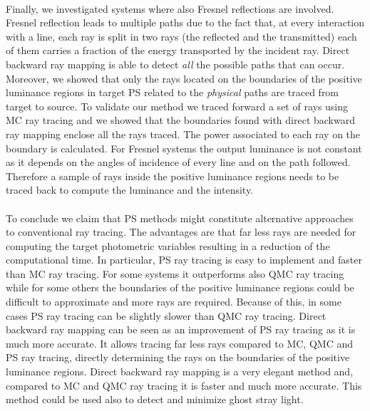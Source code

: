 \\ \indent
Finally, we investigated systems where also Fresnel reflections are involved. Fresnel reflection leads to multiple paths due to the fact that, at every interaction with a line, each ray is split in two rays (the reflected and the transmitted) each of them carries a fraction of the energy transported by the incident ray. Direct backward ray mapping is able to detect \textit{all} the possible paths that can occur. Moreover, we showed that only the rays located on the boundaries of the positive luminance regions in target PS related to the \textit{physical} paths are traced from target to source. To validate our method we traced forward a set of rays using MC ray tracing and we showed that the boundaries found with direct backward ray mapping enclose all the rays traced. The power associated to each ray on the boundary is calculated. For Fresnel systems the output luminance is not constant as it depends on the angles of incidence of every line and on the path followed. Therefore a sample of rays inside the positive luminance regions needs to be traced back to compute the luminance and the intensity.
\\ \\ \indent To conclude we claim that PS methods might constitute alternative approaches to conventional ray tracing. The advantages are that far less rays are needed for computing the target photometric variables resulting in a reduction of the computational time. In particular, PS ray tracing is easy to implement and faster than MC ray tracing. For some systems it outperforms also QMC ray tracing while for some others the boundaries of the positive luminance regions could be difficult to approximate and more rays are required. Because of this, in some cases PS ray tracing can be slightly slower than QMC ray tracing. Direct backward ray mapping can be seen as an improvement of PS ray tracing as it is much more accurate. It allows tracing far less rays compared to MC, QMC and PS ray tracing, directly determining the rays on the boundaries of the positive luminance regions. Direct backward ray mapping is a very elegant method and, compared to MC and QMC ray tracing it is faster and much more accurate. This method could be used also to detect and minimize ghost stray light. 
